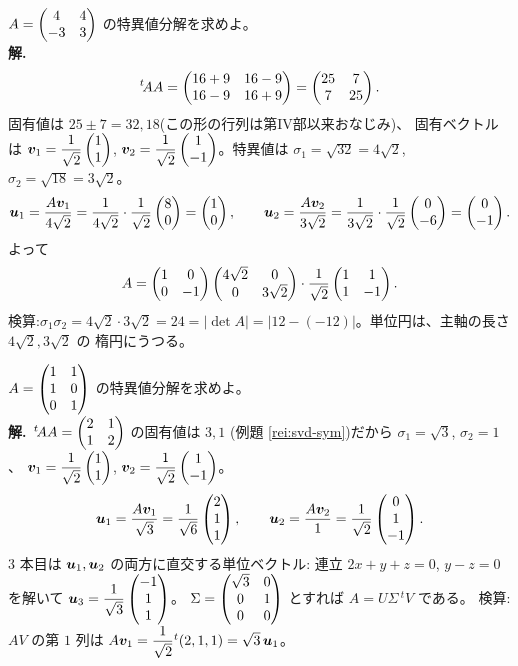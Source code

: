\begin{rei}\label{rei:svd-2x2}
$A = \begin{pmatrix}4 & 4 \\ -3 & 3\end{pmatrix}$ の特異値分解を求めよ。\\
\textbf{解.}\
\[
{}^t\!AA = \begin{pmatrix}16 + 9 & 16 - 9 \\ 16 - 9 & 16 + 9\end{pmatrix} = \begin{pmatrix}25 & 7 \\ 7 & 25\end{pmatrix}.
\]
固有値は $25 \pm 7 = 32, 18$(この形の行列は第IV部以来おなじみ)、
固有ベクトルは $\bm{v}_1 = \dfrac{1}{\sqrt{2}}\begin{pmatrix}1 \\ 1\end{pmatrix}$,
$\bm{v}_2 = \dfrac{1}{\sqrt{2}}\begin{pmatrix}1 \\ -1\end{pmatrix}$。特異値は
$\sigma_1 = \sqrt{32} = 4\sqrt{2}$, $\sigma_2 = \sqrt{18} = 3\sqrt{2}$。
\[
\bm{u}_1 = \frac{A\bm{v}_1}{4\sqrt{2}}
= \frac{1}{4\sqrt{2}}\cdot\frac{1}{\sqrt{2}}\begin{pmatrix}8 \\ 0\end{pmatrix} = \begin{pmatrix}1 \\ 0\end{pmatrix},
\qquad
\bm{u}_2 = \frac{A\bm{v}_2}{3\sqrt{2}}
= \frac{1}{3\sqrt{2}}\cdot\frac{1}{\sqrt{2}}\begin{pmatrix}0 \\ -6\end{pmatrix} = \begin{pmatrix}0 \\ -1\end{pmatrix}.
\]
よって
\[
A = \begin{pmatrix}1 & 0 \\ 0 & -1\end{pmatrix}\begin{pmatrix}4\sqrt{2} & 0 \\ 0 & 3\sqrt{2}\end{pmatrix}
\cdot\frac{1}{\sqrt{2}}\begin{pmatrix}1 & 1 \\ 1 & -1\end{pmatrix}.
\]
検算:$\sigma_1\sigma_2 = 4\sqrt{2}\cdot 3\sqrt{2} = 24 = |\det A|
= |12 - (-12)|$。単位円は、主軸の長さ $4\sqrt{2}, 3\sqrt{2}$ の
楕円にうつる。
\end{rei}

\begin{rei}\label{rei:svd-tall}
$A = \begin{pmatrix}1 & 1 \\ 1 & 0 \\ 0 & 1\end{pmatrix}$ の特異値分解を求めよ。\\
\textbf{解.}\ ${}^t\!AA = \begin{pmatrix}2 & 1 \\ 1 & 2\end{pmatrix}$ の固有値は $3, 1$
(例題 \ref{rei:svd-sym})だから $\sigma_1 = \sqrt{3}$, $\sigma_2 = 1$、
$\bm{v}_1 = \dfrac{1}{\sqrt{2}}\begin{pmatrix}1 \\ 1\end{pmatrix}$,
$\bm{v}_2 = \dfrac{1}{\sqrt{2}}\begin{pmatrix}1 \\ -1\end{pmatrix}$。
\[
\bm{u}_1 = \frac{A\bm{v}_1}{\sqrt{3}}
= \frac{1}{\sqrt{6}}\begin{pmatrix}2 \\ 1 \\ 1\end{pmatrix}, \qquad
\bm{u}_2 = \frac{A\bm{v}_2}{1} = \frac{1}{\sqrt{2}}\begin{pmatrix}0 \\ 1 \\ -1\end{pmatrix}.
\]
$3$ 本目は $\bm{u}_1, \bm{u}_2$ の両方に直交する単位ベクトル:
連立 $2x + y + z = 0$, $y - z = 0$ を解いて
$\bm{u}_3 = \dfrac{1}{\sqrt{3}}\begin{pmatrix}-1 \\ 1 \\ 1\end{pmatrix}$。
$\Sigma = \begin{pmatrix}\sqrt{3} & 0 \\ 0 & 1 \\ 0 & 0\end{pmatrix}$ とすれば
$A = U\Sigma\,{}^tV$ である。
検算:$AV$ の第 $1$ 列は $A\bm{v}_1 = \dfrac{1}{\sqrt{2}}
{}^t(2, 1, 1) = \sqrt{3}\,\bm{u}_1$。
\end{rei}

